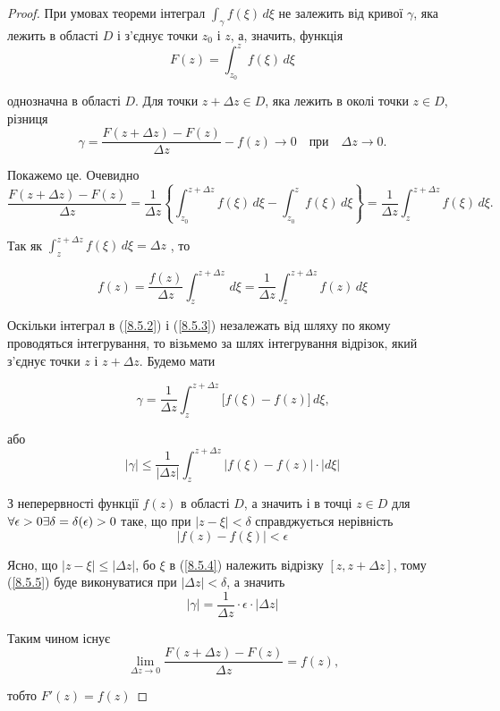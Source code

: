 \documentclass[12pt,fleqn]{article}
\theoremstyle{theorem}
\theoremstyle{proof}
\numberwithin{figure}{section}
\numberwithin{equation}{section}
\begin{document}
\begin{proof}
При умовах теореми інтеграл  \(\int_{\gamma} f(\xi) \,d\xi \) не залежить від кривої $\gamma$, яка лежить в області $D$ і з'єднує точки $z_0$ і $z$, а, значить, функція
\[ F(z) = \int_{z_0}^{z} f(\xi) \,d\xi \]

однозначна в області $D$. Для точки $z+ \Delta z\in D$, яка лежить в околі точки $z \in D$, різниця
\[ \gamma = \frac{F(z+\Delta z)-F(z)}{\Delta z} - f(z) \longrightarrow 0 \quad \text{при} \quad \Delta z \rightarrow 0. \]

Покажемо це. Очевидно
\begin{equation}\label{8.5.2}
\frac{F(z+\Delta z) - F(z)}{\Delta z} = \frac{1}{\Delta z} \left\{ \int_{z_0}^{z+\Delta z} f(\xi) \,d\xi - \int_{z_0}^{z} f(\xi) \,d\xi \right\} = \frac{1}{\Delta z} \int_{z}^{z+\Delta z} f(\xi) \,d\xi.
\end{equation}

Так як $\int_{z}^{z+\Delta z} f(\xi) \,d\xi = \Delta z $ , то

\begin{equation}\label{8.5.3}
f(z) = \frac{f(z)}{\Delta z} \int_{z}^{z+\Delta z} \,d\xi = \frac{1}{\Delta z} \int_{z}^{z+\Delta z} f(z) \,d\xi
\end{equation}

Оскільки інтеграл в (\ref{8.5.2}) і (\ref{8.5.3}) незалежать від шляху по якому проводяться інтегрування, то візьмемо за шлях інтегрування відрізок, який з'єднує точки $z$ і $z+\Delta z$. Будемо мати

\[ \gamma = \frac{1}{\Delta z} \int_{z}^{z+\Delta z}\bigg[ f(\xi) - f(z) \bigg] \,d\xi \text{,} \]

або
\begin{equation}\label{8.5.4}
|\gamma| \leq \frac{1}{|\Delta z|} \int_{z}^{z+\Delta z}\bigg| f(\xi) - f(z) \bigg|\cdot|d\xi|
\end{equation}

З неперервності функції $f(z)$ в області $D$, а значить і в точці $z\in D$ для $\\ \forall\epsilon > 0 \exists \delta = \delta(\epsilon) > 0$ таке, що при $|z-\xi|<\delta$ справджується нерівність
\begin{equation}\label{8.5.5}
|f(z)-f(\xi)|<\epsilon
\end{equation}

Ясно, що $|z-\xi|\leq |\Delta z|$, бо $\xi$ в (\ref{8.5.4}) належить відрізку $[z, z+\Delta z]$, тому (\ref{8.5.5}) буде виконуватися при $|\Delta z| < \delta$, а значить
\[ |\gamma| = \frac{1}{\Delta z} \cdot \epsilon \cdot |\Delta z|  \]

Таким чином існує
\[ \lim_{\Delta z\to 0}\frac{F(z+\Delta z)-F(z)}{\Delta z}=f(z) \text{,} \]

тобто $F'(z)=f(z)$
\end{proof}
\end{document}
